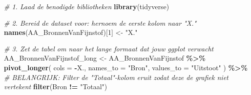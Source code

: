 \documentclass[
]{article}
\newenvironment{Shaded}{\begin{snugshade}}{\end{snugshade}}
\newcommand{\AttributeTok}[1]{\textcolor[rgb]{0.13,0.29,0.53}{#1}}
\newcommand{\CommentTok}[1]{\textcolor[rgb]{0.56,0.35,0.01}{\textit{#1}}}
\newcommand{\DecValTok}[1]{\textcolor[rgb]{0.00,0.00,0.81}{#1}}
\newcommand{\FunctionTok}[1]{\textcolor[rgb]{0.13,0.29,0.53}{\textbf{#1}}}
\newcommand{\NormalTok}[1]{#1}
\newcommand{\OtherTok}[1]{\textcolor[rgb]{0.56,0.35,0.01}{#1}}
\newcommand{\SpecialCharTok}[1]{\textcolor[rgb]{0.81,0.36,0.00}{\textbf{#1}}}
\newcommand{\StringTok}[1]{\textcolor[rgb]{0.31,0.60,0.02}{#1}}
\begin{document}
\begin{Shaded}
\begin{Highlighting}[]
\CommentTok{\# 1. Laad de benodigde bibliotheken}
\FunctionTok{library}\NormalTok{(tidyverse)}

\CommentTok{\# 2. Bereid de dataset voor: hernoem de eerste kolom naar "X."}
\FunctionTok{names}\NormalTok{(AA\_BronnenVanFijnstof)[}\DecValTok{1}\NormalTok{] }\OtherTok{\textless{}{-}} \StringTok{"X."}

\CommentTok{\# 3. Zet de tabel om naar het lange formaat dat jouw ggplot verwacht}
\NormalTok{AA\_BronnenVanFijnstof\_long }\OtherTok{\textless{}{-}}\NormalTok{ AA\_BronnenVanFijnstof }\SpecialCharTok{\%\textgreater{}\%}
  \FunctionTok{pivot\_longer}\NormalTok{(}
    \AttributeTok{cols =} \SpecialCharTok{{-}}\NormalTok{X., }
    \AttributeTok{names\_to =} \StringTok{"Bron"}\NormalTok{, }
    \AttributeTok{values\_to =} \StringTok{"Uitstoot"}
\NormalTok{  ) }\SpecialCharTok{\%\textgreater{}\%}
  \CommentTok{\# BELANGRIJK: Filter de "Totaal"{-}kolom eruit zodat deze de grafiek niet vertekent}
  \FunctionTok{filter}\NormalTok{(Bron }\SpecialCharTok{!=} \StringTok{"Totaal"}\NormalTok{)}



\end{Highlighting}
\end{Shaded}
\end{document}
